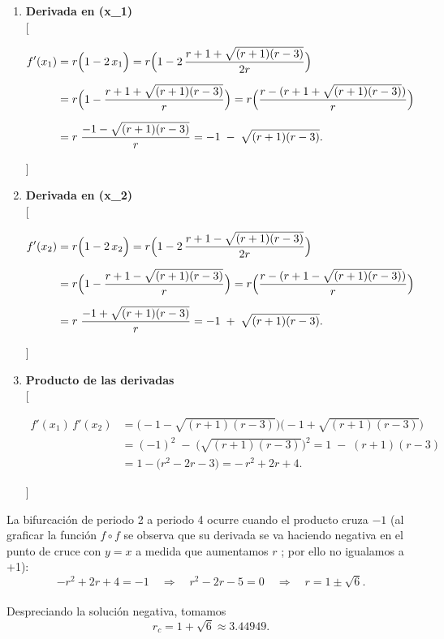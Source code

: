 \documentclass[
  11pt,
  a4paper,
  DIV=11,
  numbers=noendperiod]{scrreprt}
\begin{document}
\begin{enumerate}
\def\labelenumi{\arabic{enumi}.}
\item
  \textbf{Derivada en (x\_1)}\\
  {[}

  \begin{align*}
  f'(x_1)
  &= r\Bigl(1 - 2\,x_1\Bigr)
  = r\Bigl(1 - 2\,\frac{r+1 + \sqrt{(r+1)(r-3)}}{2r}\Bigr) \\[6pt]
  &= r\Bigl(1 - \frac{r+1 + \sqrt{(r+1)(r-3)}}{r}\Bigr)
  = r\Bigl(\frac{r - (r+1 + \sqrt{(r+1)(r-3)})}{r}\Bigr) \\[6pt]
  &= r\;\frac{-1 - \sqrt{(r+1)(r-3)}}{r}
  = -1 \;-\;\sqrt{(r+1)(r-3)}.
  \end{align*}

  {]}
\item
  \textbf{Derivada en (x\_2)}\\
  {[}

  \begin{align*}
  f'(x_2)
  &= r\Bigl(1 - 2\,x_2\Bigr)
  = r\Bigl(1 - 2\,\frac{r+1 - \sqrt{(r+1)(r-3)}}{2r}\Bigr) \\[6pt]
  &= r\Bigl(1 - \frac{r+1 - \sqrt{(r+1)(r-3)}}{r}\Bigr)
  = r\Bigl(\frac{r - (r+1 - \sqrt{(r+1)(r-3)})}{r}\Bigr) \\[6pt]
  &= r\;\frac{-1 + \sqrt{(r+1)(r-3)}}{r}
  = -1 \;+\;\sqrt{(r+1)(r-3)}.
  \end{align*}

  {]}
\item
  \textbf{Producto de las derivadas}\\
  {[}

  \begin{align*}
  f'(x_1)\,f'(x_2)
  &= \bigl(-1 - \sqrt{(r+1)(r-3)}\bigr)
     \bigl(-1 + \sqrt{(r+1)(r-3)}\bigr) \\[6pt]
  &= (-1)^2 \;-\;\bigl(\sqrt{(r+1)(r-3)}\bigr)^2
  = 1 \;-\;(r+1)(r-3) \\[4pt]
  &= 1 - \bigl(r^2 - 2r - 3\bigr)
  = -\,r^2 + 2r + 4.
  \end{align*}

  {]}
\end{enumerate}

La bifurcación de periodo 2 a periodo 4 ocurre cuando el producto cruza
\(-1\) (al graficar la función \(f \circ f\) se observa que su derivada
se va haciendo negativa en el punto de cruce con \(y=x\) a medida que
aumentamos \(r\) ; por ello no igualamos a +1): \[
-r^2 + 2r + 4 = -1
\quad\Longrightarrow\quad
r^2 - 2r - 5 = 0
\quad\Longrightarrow\quad
r = 1 \pm \sqrt{6}.
\]\\
Despreciando la solución negativa, tomamos\\
\[
r_c = 1 + \sqrt{6} \approx 3.44949.
\]
\end{document}
